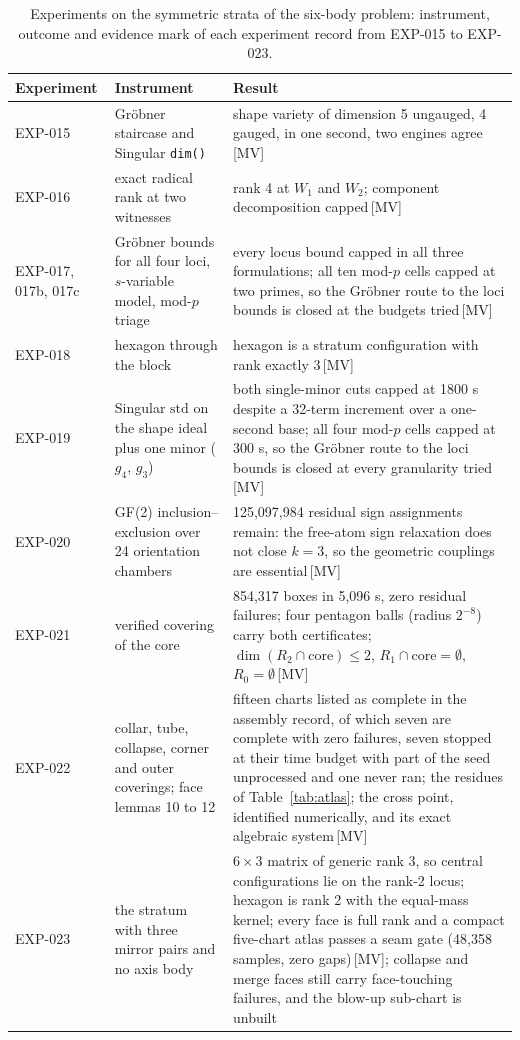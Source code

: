 \documentclass[11pt]{article}
\theoremstyle{definition}
\theoremstyle{remark}
\newcommand{\mk}[1]{\,{\scriptsize[#1]}}
\newcommand{\MV}{\mk{MV}}
\begin{document}
\begin{table}[t]\centering\footnotesize
\begin{tabular}{@{}L{2.0cm}L{4.0cm}L{6.4cm}@{}}
\toprule
Experiment & Instrument & Result \\
\midrule
EXP-015 & Gr\"obner staircase and Singular \texttt{dim()} & shape variety of dimension 5 ungauged, 4 gauged, in one second, two engines agree\MV \\
EXP-016 & exact radical rank at two witnesses & rank 4 at $W_1$ and $W_2$; component decomposition capped\MV \\
EXP-017, 017b, 017c & Gr\"obner bounds for all four loci, $s$-variable model, mod-$p$ triage & every locus bound capped in all three formulations; all ten mod-$p$ cells capped at two primes, so the Gr\"obner route to the loci bounds is closed at the budgets tried\MV \\
EXP-018 & hexagon through the block & hexagon is a stratum configuration with rank exactly 3\MV \\
EXP-019 & Singular $\mathrm{std}$ on the shape ideal plus one minor ($g_4$, $g_3$) & both single-minor cuts capped at 1800 s despite a 32-term increment over a one-second base; all four mod-$p$ cells capped at 300 s, so the Gr\"obner route to the loci bounds is closed at every granularity tried\MV \\
EXP-020 & GF(2) inclusion--exclusion over 24 orientation chambers & 125,097,984 residual sign assignments remain: the free-atom sign relaxation does not close $k=3$, so the geometric couplings are essential\MV \\
EXP-021 & verified covering of the core & 854,317 boxes in 5,096 s, zero residual failures; four pentagon balls (radius $2^{-8}$) carry both certificates; $\dim(R_2\cap\text{core})\le2$, $R_1\cap\text{core}=\emptyset$, $R_0=\emptyset$\MV \\
EXP-022 & collar, tube, collapse, corner and outer coverings; face lemmas 10 to 12 & fifteen charts listed as complete in the assembly record, of which seven are complete with zero failures, seven stopped at their time budget with part of the seed unprocessed and one never ran; the residues of Table~\ref{tab:atlas}; the cross point, identified numerically, and its exact algebraic system\MV \\
EXP-023 & the stratum with three mirror pairs and no axis body & $6\times3$ matrix of generic rank 3, so central configurations lie on the rank-2 locus; hexagon is rank 2 with the equal-mass kernel; every face is full rank and a compact five-chart atlas passes a seam gate (48,358 samples, zero gaps)\MV; collapse and merge faces still carry face-touching failures, and the blow-up sub-chart is unbuilt \\
\bottomrule
\end{tabular}
\caption{Experiments on the symmetric strata of the six-body problem: instrument, outcome and evidence mark of each experiment record from EXP-015 to EXP-023.}\label{tab:stratum}
\end{table}
\end{document}
